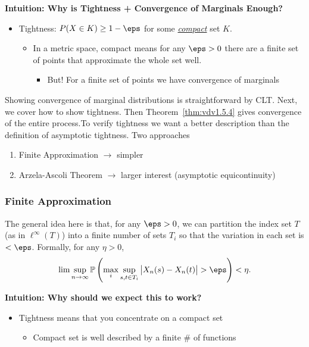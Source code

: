 
\textbf{Intuition: Why is Tightness + Convergence of Marginals Enough?}

\begin{itemize}
	\item Tightness: \(P(X\in K)\geq 1-\eps\) for some \underline{\textit{compact}} set \(K\).
	\begin{itemize}
		\item In a metric space, compact means for any \(\eps >0 \) there are a finite set of points that approximate the whole set well. 
		\begin{itemize}
			\item But! For a finite set of points we have convergence of marginals
		\end{itemize}
	\end{itemize}
\end{itemize}

Showing convergence of marginal distributions is straightforward by CLT. Next, we cover how to show tightness. Then Theorem~\ref{thm:vdv1.5.4} gives convergence of the entire process.To verify tightness we want a better description than the definition of asymptotic tightness. Two approaches
\begin{enumerate}
	\item Finite Approximation \(\to\) simpler
	\item Arzela-Ascoli Theorem \(\to\)  larger interest (asymptotic equicontinuity)
\end{enumerate}

\subsubsection{Finite Approximation}

The general idea here is that, for any \(\eps > 0\), we can partition the index set \(T\) (as in \(\ell^\infty(T)\)) into a finite number of sets \(T_i\) so that the variation in each set is  \(< \eps\). Formally, for any \(\eta > 0\),
\[
	 \lim\sup_{n\to\infty} \P\left(\max_i \sup_{s,t\in T_i}\left|X_n(s)-X_n(t)\right|>\eps\right)<\eta
.\]

\textbf{Intuition: Why should we expect this to work?}
\begin{itemize}
	\item Tightness means that you concentrate on a compact set
	\begin{itemize}
		\item Compact set is well described by a finite \# of functions 
	\end{itemize}
\end{itemize}

